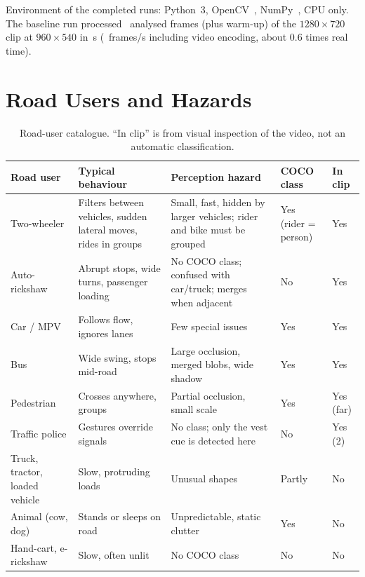 \documentclass[11pt,a4paper]{article}
\begin{document}
Environment of the completed runs: Python~3, OpenCV~\mOpenCV, NumPy~\mNumpy, CPU only. The baseline run processed \mFramesAnalysed\ analysed frames
(plus warm-up) of the $1280\times720$ clip at $960\times540$ in \mWall\,s (\mProcFps\ frames/s including video encoding, about 0.6 times real time).

\section{Road Users and Hazards}
\begin{table}[H]
\centering
\caption{Road-user catalogue. ``In clip'' is from visual inspection of the video, not an automatic classification.}
\small
\begin{tabular}{@{}p{2.6cm}p{3.9cm}p{4.3cm}p{1.5cm}p{1.2cm}@{}}
\toprule
Road user & Typical behaviour & Perception hazard & COCO class & In clip \\
\midrule
Two-wheeler & Filters between vehicles, sudden lateral moves, rides in groups & Small, fast, hidden by larger vehicles; rider and bike must be grouped & Yes (rider = person) & Yes \\
Auto-rickshaw & Abrupt stops, wide turns, passenger loading & No COCO class; confused with car/truck; merges when adjacent & No & Yes \\
Car / MPV & Follows flow, ignores lanes & Few special issues & Yes & Yes \\
Bus & Wide swing, stops mid-road & Large occlusion, merged blobs, wide shadow & Yes & Yes \\
Pedestrian & Crosses anywhere, groups & Partial occlusion, small scale & Yes & Yes (far) \\
Traffic police & Gestures override signals & No class; only the vest cue is detected here & No & Yes (2) \\
Truck, tractor, loaded vehicle & Slow, protruding loads & Unusual shapes & Partly & No \\
Animal (cow, dog) & Stands or sleeps on road & Unpredictable, static clutter & Yes & No \\
Hand-cart, e-rickshaw & Slow, often unlit & No COCO class & No & No \\
\bottomrule
\end{tabular}
\end{table}
\end{document}
